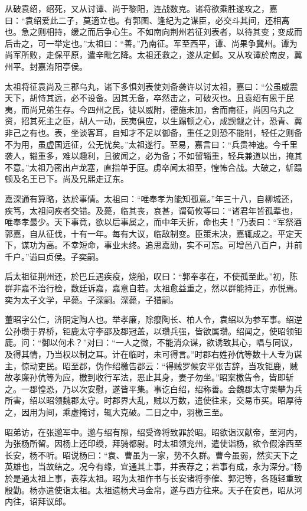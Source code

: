\documentclass[12pt,UTF8]{ctexbook}
\begin{document}
从破袁绍，绍死，又从讨谭、尚于黎阳，连战数克。诸将欲乘胜遂攻之，嘉曰：“袁绍爱此二子，莫適立也。有郭图、逢纪为之谋臣，必交斗其间，还相离也。急之则相持，缓之而后争心生。不如南向荆州若征刘表者，以待其变；变成而后击之，可一举定也。”太祖曰：“善。”乃南征。军至西平，谭、尚果争冀州。谭为尚军所败，走保平原，遣辛毗乞降。太祖还救之，遂从定邺。又从攻谭於南皮，冀州平。封嘉洧阳亭侯。

太祖将征袁尚及三郡乌丸，诸下多惧刘表使刘备袭许以讨太祖，嘉曰：“公虽威震天下，胡恃其远，必不设备。因其无备，卒然击之，可破灭也。且袁绍有恩于民夷，而尚兄弟生存。今四州之民，徒以威附，德施未加，舍而南征，尚因乌丸之资，招其死主之臣，胡人一动，民夷俱应，以生蹋顿之心，成觊觎之计，恐青、冀非己之有也。表，坐谈客耳，自知才不足以御备，重任之则恐不能制，轻任之则备不为用，虽虚国远征，公无忧矣。”太祖遂行。至易，嘉言曰：“兵贵神速。今千里袭人，辎重多，难以趣利，且彼闻之，必为备；不如留辎重，轻兵兼道以出，掩其不意。”太祖乃密出卢龙塞，直指单于庭。虏卒闻太祖至，惶怖合战。大破之，斩蹋顿及名王已下。尚及兄熙走辽东。

嘉深通有算略，达於事情。太祖曰：“唯奉孝为能知孤意。”年三十八，自柳城还，疾笃，太祖问疾者交错。及薨，临其丧，哀甚，谓荀攸等曰：“诸君年皆孤辈也，唯奉孝最少。天下事竟，欲以后事属之，而中年夭折，命也夫！”乃表曰：“军祭酒郭嘉，自从征伐，十有一年。每有大议，临敌制变。臣策未决，嘉辄成之。平定天下，谋功为高。不幸短命，事业未终。追思嘉勋，实不可忘。可增邑八百户，并前千户。”谥曰贞侯。子奕嗣。

后太祖征荆州还，於巴丘遇疾疫，烧船，叹曰：“郭奉孝在，不使孤至此。”初，陈群非嘉不治行检，数廷诉嘉，嘉意自若。太祖愈益重之，然以群能持正，亦悦焉。奕为太子文学，早薨。子深嗣。深薨，子猎嗣。

董昭字公仁，济阴定陶人也。举孝廉，除癭陶长、柏人令，袁绍以为参军事。绍逆公孙瓒于界桥，钜鹿太守李邵及郡冠盖，以瓒兵强，皆欲属瓒。绍闻之，使昭领钜鹿。问：“御以何术？”对曰：“一人之微，不能消众谋，欲诱致其心，唱与同议，及得其情，乃当权以制之耳。计在临时，未可得言。”时郡右姓孙伉等数十人专为谋主，惊动吏民。昭至郡，伪作绍檄告郡云：“得贼罗候安平张吉辞，当攻钜鹿，贼故孝廉孙伉等为应，檄到收行军法，恶止其身，妻子勿坐。”昭案檄告令，皆即斩之。一郡惶恐，乃以次安慰，遂皆平集。事讫白绍，绍称善。会魏郡太守栗攀为兵所害，绍以昭领魏郡太守。时郡界大乱，贼以万数，遣使往来，交易市买。昭厚待之，因用为间，乘虚掩讨，辄大克破。二日之中，羽檄三至。

昭弟访，在张邈军中。邈与绍有隙，绍受谗将致罪於昭。昭欲诣汉献帝，至河内，为张杨所留。因杨上还印绶，拜骑都尉。时太祖领兖州，遣使诣杨，欲令假涂西至长安，杨不听。昭说杨曰：“袁、曹虽为一家，势不久群。曹今虽弱，然实天下之英雄也，当故结之。况今有缘，宜通其上事，并表荐之；若事有成，永为深分。”杨於是通太祖上事，表荐太祖。昭为太祖作书与长安诸将李傕、郭汜等，各随轻重致殷勤。杨亦遣使诣太祖。太祖遗杨犬马金帛，遂与西方往来。天子在安邑，昭从河内往，诏拜议郎。
\end{document}

